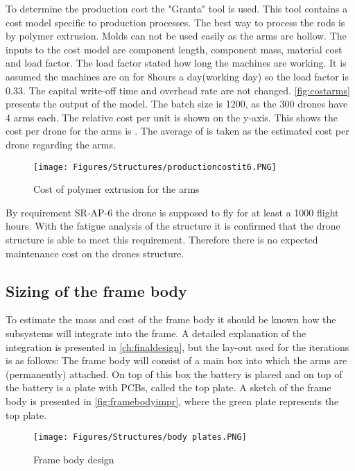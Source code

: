 To determine the production cost the "Granta" tool is used\cite{materialbible}. This tool contains a cost model specific to production processes. The best way to process the rods is by polymer extrusion. Molds can not be used easily as the arms are hollow. The inputs to the cost model are component length, component mass, material cost and load factor. The load factor stated how long the machines are working. It is assumed the machines are on for 8hours a day(working day) so the load factor is 0.33. The capital write-off time and overhead rate are not changed. \autoref{fig:costarms} presents the output of the model. The batch size is 1200, as the 300 drones have 4 arms each. The relative cost per unit is shown on the y-axis. This shows the cost per drone for the arms is . The average of  is taken as the estimated cost per drone regarding the arms.
\begin{figure}[H]
    \centering
    \texttt{[image: Figures/Structures/productioncostit6.PNG]}
    \caption{Cost of polymer extrusion for the arms\cite{materialbible}}
    \label{fig:costarms}
\end{figure}

By requirement SR-AP-6 the drone is supposed to fly for at least a 1000 flight hours. With the fatigue analysis of the structure it is confirmed that the drone structure is able to meet this requirement. Therefore there is no expected maintenance cost on the drones structure.

\subsection{Sizing of the frame body}
To estimate the mass and cost of the frame body it should be known how the subsystems will integrate into the frame. A detailed explanation of the integration is presented in \autoref{ch:finaldesign}, but the lay-out used for the iterations is as follows:
The frame body will consist of a main box into which the arms are (permanently) attached. On top of this box the battery is placed and on top of the battery is a plate with PCBs, called the top plate. A sketch of the frame body is presented in \autoref{fig:framebodyimpr}, where the green plate represents the top plate. 

\begin{figure}[H]
    \centering
    \texttt{[image: Figures/Structures/body plates.PNG]}
    \caption{Frame body design}
    \label{fig:framebodyimpr}
\end{figure}


